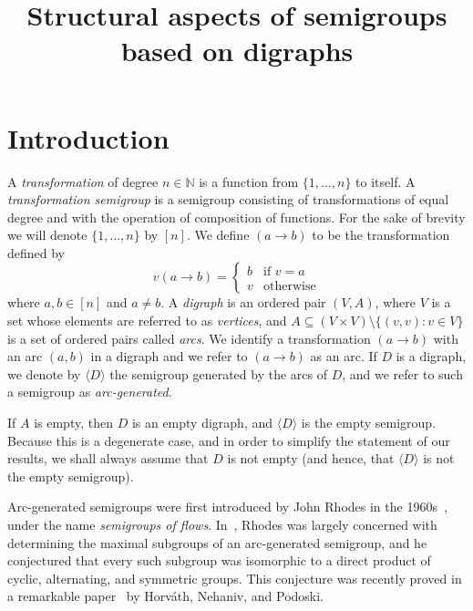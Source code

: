\documentclass[ALCO,ThmDefs,Unicode,epreuves]{cedram}
\author{\firstname{James} \lastname{East}} %
\author{\firstname{Maximilien} \lastname{Gadouleau}} %
\author{\firstname{James} \middlename{D.} \lastname{Mitchell}} %
\title[Structural aspects of semigroups based on digraphs]{Structural aspects of semigroups based on digraphs}
\newcommand{\N}{\mathbb{N}}
\newcommand{\genset}[1]{\langle#1\rangle}
\newcommand{\nset}{[n]}
\begin{document}
\maketitle

\section{Introduction}

A \emph{transformation} of degree $n\in \N$ is a function from $\{1, \ldots,
n\}$ to itself. A \emph{transformation semigroup} is a semigroup consisting
of transformations of equal degree and with the operation of composition of
functions. For the sake of brevity we will denote $\{1,\ldots,n\}$ by $\nset$.
We define $(a \to b)$ to be the transformation defined by
\begin{equation*} 
v (a \to b) = 
 \begin{cases}
 b & \text{if } v = a\\
 v & \text{otherwise}
 \end{cases} 
\end{equation*}
where $a, b \in \nset$ and $a \ne b$. A \emph{digraph} is an ordered pair
$(V, A)$, where $V$ is a set whose elements are referred to as
\emph{vertices}, and $A\subseteq (V\times V) \setminus \{(v,v) : v \in V\}$
is a set of ordered pairs called
\emph{arcs}. We identify a transformation $(a \to b)$ with an arc $(a, b)$
in a digraph and we refer to $(a \to b)$ as an arc. If $D$ is a digraph,
we denote by $\langle D \rangle$ the semigroup generated by
the arcs of $D$, and we refer to such a semigroup as \emph{arc-generated}.

If $A$ is empty, then $D$ is an empty digraph, and $\genset{D}$ is the empty
semigroup. Because this is a degenerate case, and in order to simplify the
statement of our results, we shall always assume that $D$ is not empty (and
hence, that $\genset{D}$ is not the empty semigroup). 

Arc-generated semigroups were first introduced by John Rhodes in the
1960s~\cite[Definition~6.51]{Rhodes2009aa}, under the name \emph{semigroups of flows}.
In~\cite{Rhodes2009aa}, Rhodes was largely concerned with determining the maximal
subgroups of an arc-generated semigroup, and he conjectured that every such
subgroup was isomorphic to a direct product of cyclic, alternating, and
symmetric groups.
This conjecture was recently proved in a remarkable paper~\cite{Horvath2017aa} by
Horv{\'a}th, Nehaniv, and Podoski. 
\end{document}
